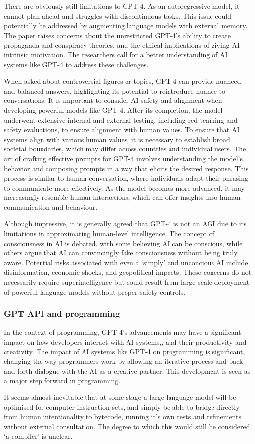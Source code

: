 There are obviously still limitations to GPT-4. As an autoregressive model, it cannot plan ahead and struggles with discontinuous tasks. This issue could potentially be addressed by augmenting language models with external memory. The paper raises concerns about the unrestricted GPT-4's ability to create propaganda and conspiracy theories, and the ethical implications of giving AI intrinsic motivation. The researchers call for a better understanding of AI systems like GPT-4 to address these challenges.\par
When asked about controversial figures or topics, GPT-4 can provide nuanced and balanced answers, highlighting its potential to reintroduce nuance to conversations. It is important to consider AI safety and alignment when developing powerful models like GPT-4. After its completion, the model underwent extensive internal and external testing, including red teaming and safety evaluations, to ensure alignment with human values. To ensure that AI systems align with various human values, it is necessary to establish broad societal boundaries, which may differ across countries and individual users. The art of crafting effective prompts for GPT-4 involves understanding the model's behavior and composing prompts in a way that elicits the desired response. This process is similar to human conversation, where individuals adapt their phrasing to communicate more effectively. As the model becomes more advanced, it may increasingly resemble human interactions, which can offer insights into human communication and behaviour. \par 
Although impressive, it is generally agreed that GPT-4 is not an AGI due to its limitations in approximating human-level intelligence. The concept of consciousness in AI is debated, with some believing AI can be conscious, while others argue that AI can convincingly fake consciousness without being truly aware. Potential risks associated with even a `simply' and unconcious AI include disinformation, economic shocks, and geopolitical impacts. These concerns do not necessarily require superintelligence but could result from large-scale deployment of powerful language models without proper safety controls.
\subsubsection{GPT API and programming}
In the context of programming, GPT-4's advancements may have a significant impact on how developers interact with AI systems,, and their productivity and creativity. The impact of AI systems like GPT-4 on programming is significant, changing the way programmers work by allowing an iterative process and back-and-forth dialogue with the AI as a creative partner. This development is seen as a major step forward in programming.\par 
It seems almost inevitable that at some stage a large language model will be optimised for computer instruction sets,   and simply be able to bridge directly from human intentionality to bytecode, running it's own tests and refinements without external consultation. The degree to which this would still be considered `a compiler' is unclear.

